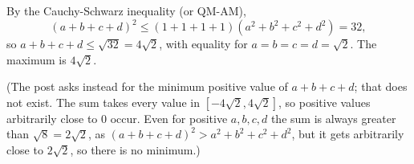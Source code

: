 By the Cauchy-Schwarz inequality (or QM-AM),
\[
(a+b+c+d)^2\le(1+1+1+1)(a^2+b^2+c^2+d^2)=32,
\]
so $a+b+c+d\le\sqrt{32}=4\sqrt2$, with equality for $a=b=c=d=\sqrt2$. The maximum is $\boxed{4\sqrt2}$.

(The post asks instead for the minimum positive value of $a+b+c+d$; that does not exist. The sum takes every value in $[-4\sqrt2,4\sqrt2]$, so positive values arbitrarily close to $0$ occur. Even for positive $a,b,c,d$ the sum is always greater than $\sqrt8=2\sqrt2$, as $(a+b+c+d)^2>a^2+b^2+c^2+d^2$, but it gets arbitrarily close to $2\sqrt2$, so there is no minimum.)

